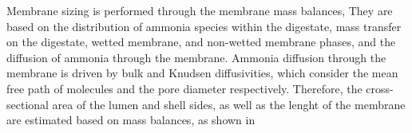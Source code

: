 \begin{refsection}[referencesCh6]

Membrane sizing is performed through the membrane mass balances, {} They are based on the distribution of ammonia species within the digestate, mass transfer on the digestate, wetted membrane, and non-wetted membrane phases, and the diffusion of ammonia through the membrane. Ammonia diffusion through the membrane is driven by bulk and Knudsen diffusivities, which consider the mean free path of molecules and the pore diameter respectively. Therefore, the cross-sectional area of the lumen and shell sides, as well as the lenght of the membrane are estimated based on mass balances, as shown in {}


\end{refsection}
